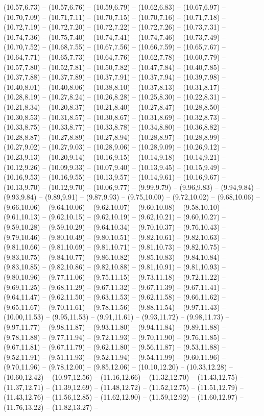 \expandafter\def\csname geo:gebiet:POL\endcsname{
  (10.57,6.73) -- (10.57,6.76) -- (10.59,6.79) -- (10.62,6.83) -- (10.67,6.97) -- (10.70,7.09) -- (10.71,7.11) -- (10.70,7.15) -- (10.70,7.16) -- (10.71,7.18) -- (10.72,7.19) -- (10.72,7.20) -- (10.72,7.22) -- (10.72,7.26) -- (10.73,7.31) -- (10.74,7.36) -- (10.75,7.40) -- (10.74,7.41) -- (10.74,7.46) -- (10.73,7.49) -- (10.70,7.52) -- (10.68,7.55) -- (10.67,7.56) -- (10.66,7.59) -- (10.65,7.67) -- (10.64,7.71) -- (10.65,7.73) -- (10.64,7.76) -- (10.62,7.78) -- (10.60,7.79) -- (10.57,7.80) -- (10.52,7.81) -- (10.50,7.82) -- (10.47,7.84) -- (10.40,7.85) -- (10.37,7.88) -- (10.37,7.89) -- (10.37,7.91) -- (10.37,7.94) -- (10.39,7.98) -- (10.40,8.01) -- (10.40,8.06) -- (10.38,8.10) -- (10.37,8.13) -- (10.31,8.17) -- (10.28,8.19) -- (10.27,8.24) -- (10.26,8.28) -- (10.25,8.30) -- (10.22,8.31) -- (10.21,8.34) -- (10.20,8.37) -- (10.21,8.40) -- (10.27,8.47) -- (10.28,8.50) -- (10.30,8.53) -- (10.31,8.57) -- (10.30,8.67) -- (10.31,8.69) -- (10.32,8.73) -- (10.33,8.75) -- (10.33,8.77) -- (10.33,8.78) -- (10.34,8.80) -- (10.36,8.82) -- (10.28,8.87) -- (10.27,8.89) -- (10.27,8.94) -- (10.28,8.97) -- (10.28,8.99) -- (10.27,9.02) -- (10.27,9.03) -- (10.28,9.06) -- (10.28,9.09) -- (10.26,9.12) -- (10.23,9.13) -- (10.20,9.14) -- (10.16,9.15) -- (10.14,9.18) -- (10.14,9.21) -- (10.12,9.26) -- (10.09,9.33) -- (10.07,9.40) -- (10.13,9.45) -- (10.15,9.49) -- (10.16,9.53) -- (10.16,9.55) -- (10.13,9.57) -- (10.14,9.61) -- (10.16,9.67) -- (10.13,9.70) -- (10.12,9.70) -- (10.06,9.77) -- (9.99,9.79) -- (9.96,9.83) -- (9.94,9.84) -- (9.93,9.84) -- (9.89,9.91) -- (9.87,9.93) -- (9.75,10.00) -- (9.72,10.02) -- (9.68,10.06) -- (9.66,10.06) -- (9.64,10.06) -- (9.62,10.07) -- (9.60,10.08) -- (9.58,10.10) -- (9.61,10.13) -- (9.62,10.15) -- (9.62,10.19) -- (9.62,10.21) -- (9.60,10.27) -- (9.59,10.28) -- (9.59,10.29) -- (9.64,10.34) -- (9.70,10.37) -- (9.76,10.43) -- (9.79,10.46) -- (9.80,10.49) -- (9.80,10.51) -- (9.82,10.61) -- (9.82,10.63) -- (9.81,10.66) -- (9.81,10.69) -- (9.81,10.71) -- (9.81,10.73) -- (9.82,10.75) -- (9.83,10.75) -- (9.84,10.77) -- (9.86,10.82) -- (9.85,10.83) -- (9.84,10.84) -- (9.83,10.85) -- (9.82,10.86) -- (9.82,10.88) -- (9.81,10.91) -- (9.81,10.93) -- (9.80,10.96) -- (9.77,11.06) -- (9.75,11.15) -- (9.73,11.18) -- (9.72,11.22) -- (9.69,11.25) -- (9.68,11.29) -- (9.67,11.32) -- (9.67,11.39) -- (9.67,11.41) -- (9.64,11.47) -- (9.62,11.50) -- (9.63,11.53) -- (9.62,11.58) -- (9.66,11.62) -- (9.65,11.67) -- (9.70,11.61) -- (9.78,11.56) -- (9.88,11.54) -- (9.97,11.43) -- (10.00,11.53) -- (9.95,11.53) -- (9.91,11.61) -- (9.93,11.72) -- (9.98,11.73) -- (9.97,11.77) -- (9.98,11.87) -- (9.93,11.80) -- (9.94,11.84) -- (9.89,11.88) -- (9.78,11.88) -- (9.77,11.94) -- (9.72,11.93) -- (9.70,11.90) -- (9.76,11.85) -- (9.67,11.81) -- (9.67,11.79) -- (9.62,11.80) -- (9.56,11.87) -- (9.53,11.88) -- (9.52,11.91) -- (9.51,11.93) -- (9.52,11.94) -- (9.54,11.99) -- (9.60,11.96) -- (9.70,11.96) -- (9.78,12.00) -- (9.85,12.06) -- (10.10,12.20) -- (10.33,12.28) -- (10.60,12.42) -- (10.97,12.56) -- (11.16,12.66) -- (11.32,12.70) -- (11.43,12.75) -- (11.37,12.71) -- (11.39,12.69) -- (11.48,12.72) -- (11.52,12.75) -- (11.51,12.79) -- (11.43,12.76) -- (11.56,12.85) -- (11.62,12.90) -- (11.59,12.92) -- (11.60,12.97) -- (11.76,13.22) -- (11.82,13.27) -- }
